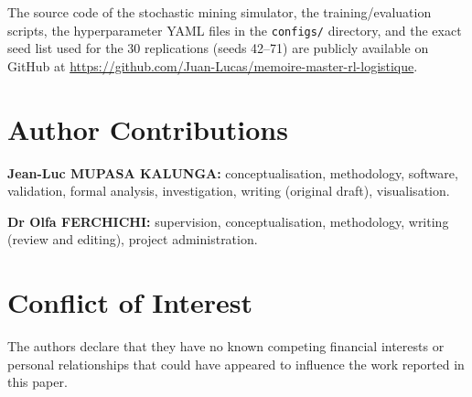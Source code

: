 \documentclass[11pt,a4paper]{article}
\begin{document}
The source code of the stochastic mining simulator, the training/evaluation scripts, the hyperparameter YAML files in the \texttt{configs/} directory, and the exact seed list used for the 30 replications (seeds 42--71) are publicly available on GitHub at \url{https://github.com/Juan-Lucas/memoire-master-rl-logistique}.

\section*{Author Contributions}

\textbf{Jean-Luc MUPASA KALUNGA:} conceptualisation, methodology, software, validation, formal analysis, investigation, writing (original draft), visualisation.

\textbf{Dr Olfa FERCHICHI:} supervision, conceptualisation, methodology, writing (review and editing), project administration.

\section*{Conflict of Interest}

The authors declare that they have no known competing financial interests or personal relationships that could have appeared to influence the work reported in this paper.



\end{document}
